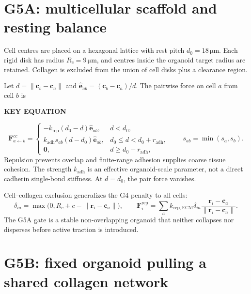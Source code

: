 \documentclass[10.5pt]{article}
\newcommand{\rv}{\mathbf r}
\newcommand{\cv}{\mathbf c}
\newcommand{\Fv}{\mathbf F}
\newcommand{\ev}{\widehat{\mathbf e}}
\newcommand{\keylabel}{\par\smallskip\noindent\textcolor{g5}{\textbf{KEY EQUATION}}\par\vspace{-5pt}}
\newcommand{\unit}[1]{\,\mathrm{#1}}
\begin{document}
\section{G5A: multicellular scaffold and resting balance}

Cell centres are placed on a hexagonal lattice with rest pitch
$d_0=18\unit{\mu m}$. Each rigid disk has radius $R_c=9\unit{\mu m}$, and centres inside the
organoid target radius are retained. Collagen is excluded from the union of cell disks plus a
clearance region.

Let $d=\lVert\cv_b-\cv_a\rVert$ and
$\ev_{ab}=(\cv_b-\cv_a)/d$. The pairwise force on cell $a$ from cell $b$ is
\keylabel
\begin{equation}
 \Fv_{a\leftarrow b}^{cc}=
 \begin{cases}
 -k_{\mathrm{rep}}(d_0-d)\ev_{ab},&d<d_0,\\
 k_{\mathrm{adh}}s_{ab}(d-d_0)\ev_{ab},&d_0\le d<d_0+r_{\mathrm{adh}},\\
 \mathbf 0,&d\ge d_0+r_{\mathrm{adh}},
 \end{cases}
 \qquad s_{ab}=\min(s_a,s_b).
 \label{eq:cellcell}
\end{equation}
Repulsion prevents overlap and finite-range adhesion supplies coarse tissue cohesion. The
strength $k_{\mathrm{adh}}$ is an effective organoid-scale parameter, not a direct cadherin
single-bond stiffness. At $d=d_0$, the pair force vanishes.

Cell--collagen exclusion generalizes the G4 penalty to all cells:
\begin{equation}
 \delta_{ia}=\max\big(0,R_c+c-\lVert\rv_i-\cv_a\rVert\big),\qquad
 \Fv_i^{\mathrm{rep}}=\sum_a k_{\mathrm{rep,ECM}}\delta_{ia}
 \frac{\rv_i-\cv_a}{\lVert\rv_i-\cv_a\rVert}.
 \label{eq:multirep}
\end{equation}
The G5A gate is a stable non-overlapping organoid that neither collapses nor disperses before
active traction is introduced.

\section{G5B: fixed organoid pulling a shared collagen network}
\end{document}
